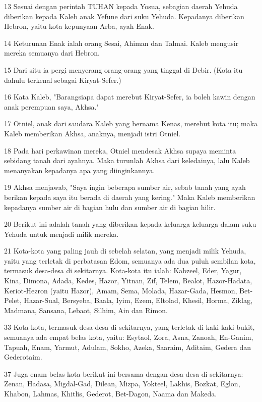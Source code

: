 \par 13 Sesuai dengan perintah TUHAN kepada Yosua, sebagian daerah Yehuda diberikan kepada Kaleb anak Yefune dari suku Yehuda. Kepadanya diberikan Hebron, yaitu kota kepunyaan Arba, ayah Enak.
\par 14 Keturunan Enak ialah orang Sesai, Ahiman dan Talmai. Kaleb mengusir mereka semuanya dari Hebron.
\par 15 Dari situ ia pergi menyerang orang-orang yang tinggal di Debir. (Kota itu dahulu terkenal sebagai Kiryat-Sefer.)
\par 16 Kata Kaleb, "Barangsiapa dapat merebut Kiryat-Sefer, ia boleh kawin dengan anak perempuan saya, Akhsa."
\par 17 Otniel, anak dari saudara Kaleb yang bernama Kenas, merebut kota itu; maka Kaleb memberikan Akhsa, anaknya, menjadi istri Otniel.
\par 18 Pada hari perkawinan mereka, Otniel mendesak Akhsa supaya meminta sebidang tanah dari ayahnya. Maka turunlah Akhsa dari keledainya, lalu Kaleb menanyakan kepadanya apa yang diinginkannya.
\par 19 Akhsa menjawab, "Saya ingin beberapa sumber air, sebab tanah yang ayah berikan kepada saya itu berada di daerah yang kering." Maka Kaleb memberikan kepadanya sumber air di bagian hulu dan sumber air di bagian hilir.
\par 20 Berikut ini adalah tanah yang diberikan kepada keluarga-keluarga dalam suku Yehuda untuk menjadi milik mereka.
\par 21 Kota-kota yang paling jauh di sebelah selatan, yang menjadi milik Yehuda, yaitu yang terletak di perbatasan Edom, semuanya ada dua puluh sembilan kota, termasuk desa-desa di sekitarnya. Kota-kota itu ialah: Kabzeel, Eder, Yagur, Kina, Dimona, Adada, Kedes, Hazor, Yitnan, Zif, Telem, Bealot, Hazor-Hadata, Keriot-Hezron (yaitu Hazor), Amam, Sema, Molada, Hazar-Gada, Hesmon, Bet-Pelet, Hazar-Sual, Bersyeba, Baala, Iyim, Ezem, Eltolad, Khesil, Horma, Ziklag, Madmana, Sansana, Lebaot, Silhim, Ain dan Rimon.
\par 33 Kota-kota, termasuk desa-desa di sekitarnya, yang terletak di kaki-kaki bukit, semuanya ada empat belas kota, yaitu: Esytaol, Zora, Asna, Zanoah, En-Ganim, Tapuah, Enam, Yarmut, Adulam, Sokho, Azeka, Saaraim, Aditaim, Gedera dan Gederotaim.
\par 37 Juga enam belas kota berikut ini bersama dengan desa-desa di sekitarnya: Zenan, Hadasa, Migdal-Gad, Dilean, Mizpa, Yokteel, Lakhis, Bozkat, Eglon, Khabon, Lahmas, Khitlis, Gederot, Bet-Dagon, Naama dan Makeda.
